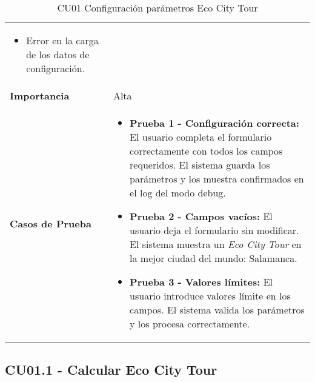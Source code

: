 \begin{table}[H]
\begin{tabularx}{\linewidth}{ p{} p{} }
\begin{itemize}
			\item Error en la carga de los datos de configuración.
		\end{itemize}\\
		\textbf{Importancia}          & Alta \\
		\textbf{Casos de Prueba}      &
		\begin{itemize}
			\item \textbf{Prueba 1 - Configuración correcta:} El usuario completa el formulario correctamente con todos los campos requeridos. El sistema guarda los parámetros y los muestra confirmados en el log del modo debug.
			\vspace{2pt}
			\item \textbf{Prueba 2 - Campos vacíos:} El usuario deja el formulario sin modificar. El sistema muestra un \textit{Eco City Tour} en la mejor ciudad del mundo: Salamanca.
			\vspace{2pt}
			\item \textbf{Prueba 3 - Valores límites:} El usuario introduce valores límite en los campos. El sistema valida los parámetros y los procesa correctamente.
		\end{itemize} \\
		\bottomrule
	\end{tabularx}
	\caption{CU01 Configuración parámetros Eco City Tour}
	\label{cu:config-parametros}
\end{table}


\subsection{CU01.1 - Calcular Eco City Tour}

